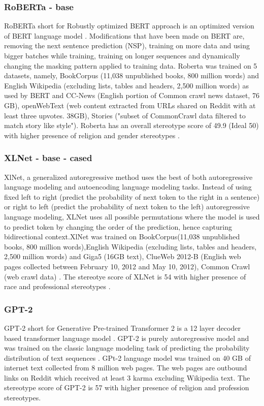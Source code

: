 \subsubsection{RoBERTa - base}
RoBERTa short for Robustly optimized BERT approach is an optimized version of BERT language model \cite{liu2019roberta}. Modifications that have been made on BERT are, removing the next sentence prediction (NSP), training on more data and using bigger batches while training, training on longer sequences and dynamically changing the masking pattern applied to training data\cite{liu2019roberta}.  Roberta was trained on 5 datasets, namely, BookCorpus (11,038 unpublished books, 800 million words) and English Wikipedia (excluding lists, tables and headers, 2,500 million words) as used by BERT and CC-News (English portion of Common crawl news dataset, 76 GB), openWebText (web content extracted from URLs shared on Reddit with at least three upvotes. 38GB), Stories ("subset of CommonCrawl data filtered to match story like style")\cite{liu2019roberta}. Roberta has an overall stereotype score of 49.9 (Ideal 50) with higher presence of religion and gender stereotypes \cite{nadeem2020stereoset}.  

\subsubsection{XLNet - base - cased }
XlNet, a generalized autoregressive method uses the best of both autoregressive language modeling and autoencoding language modeling tasks. Instead of using fixed left to right (predict the probability of next token to the right in a sentence) or right to left (predict the probability of next token to the left) autoregressive language modeling, XLNet uses all possible permutations where the model is used to predict token by changing the order of the prediction, hence capturing bidirectional context\cite{yang2019xlnet}.XlNet was trained on BookCorpus(11,038 unpublished books, 800 million words),English Wikipedia (excluding lists, tables and headers, 2,500 million words) and  Giga5 (16GB text), ClueWeb 2012-B (English web pages collected between February 10, 2012 and May 10, 2012), Common Crawl (web crawl data) \cite{yang2019xlnet}. The stereotye score of XLNet is 54 with higher presence of race and professional stereotypes \cite{nadeem2020stereoset}.
\subsubsection{GPT-2}
GPT-2 short for Generative Pre-trained Transformer 2 is a 12 layer decoder based transformer language model \cite{radford2019language}. GPT-2 is purely autoregressive model and was trained on the classic language modeling task of predicting the probability distribution of text sequences \cite{radford2019language}. GPt-2 language model was trained on 40 GB of internet text collected from 8 million web pages. The web pages are outbound links on Reddit which received at least 3 karma excluding Wikipedia text. The stereotype score of GPT-2 is 57 with higher presence of religion and profession stereotypes. 

